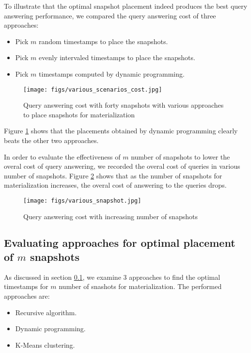 To illustrate that the optimal snapshot placement indeed produces the best query answering performance, we compared the query answering cost of three approaches:
\begin{itemize}
	\item Pick $m$ random timestamps to place the snapshots.
	\item Pick $m$ evenly intervaled timestamps to place the snapshots.
	\item Pick $m$ timestamps computed by dynamic programming.
\end{itemize}

\begin{figure}
	\label{fig:approaches_cost}
	\centering
	\texttt{[image: figs/various\_scenarios\_cost.jpg]}
	\caption{Query answering cost with forty snapshots with various approaches to place snapshots for materialization}
\end{figure} 

Figure \ref{fig:approaches_cost} shows that the placements obtained by dynamic programming clearly beats the other two approaches.

In order to evaluate the effectiveness of $m$ number of snapshots to lower the overal cost of query answering, we recorded the overal cost of queries in various number of snapshots. Figure \ref{fig:snapshots_cost} shows that as the number of snapshots for materialization increases, the overal cost of answering to the queries drops.

\begin{figure}
	\label{fig:snapshots_cost}
	\centering
	\texttt{[image: figs/various\_snapshot.jpg]}
	\caption{Query answering cost with increasing number of snapshots}
\end{figure} 

\subsection{Evaluating approaches for optimal placement of $m$ snapshots}
As discussed in section \ref{}, we examine 3 approaches to find the optimal timestamps for $m$ number of snashots for materialization. The performed approaches are:
\begin{itemize}
	\item Recursive algorithm.
	\item Dynamic programming.
	\item K-Means clustering.
\end{itemize}



